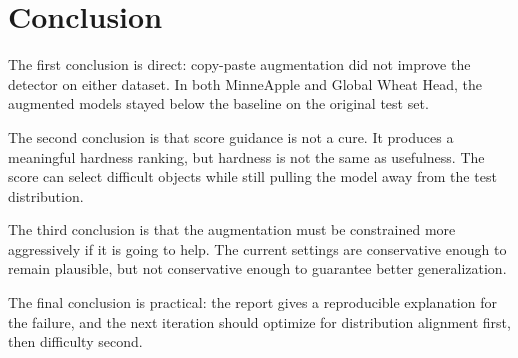 \section{Conclusion}

The first conclusion is direct: copy-paste augmentation did not improve the detector on either dataset. In both MinneApple and Global Wheat Head, the augmented models stayed below the baseline on the original test set.

The second conclusion is that score guidance is not a cure. It produces a meaningful hardness ranking, but hardness is not the same as usefulness. The score can select difficult objects while still pulling the model away from the test distribution.

The third conclusion is that the augmentation must be constrained more aggressively if it is going to help. The current settings are conservative enough to remain plausible, but not conservative enough to guarantee better generalization.

The final conclusion is practical: the report gives a reproducible explanation for the failure, and the next iteration should optimize for distribution alignment first, then difficulty second.
